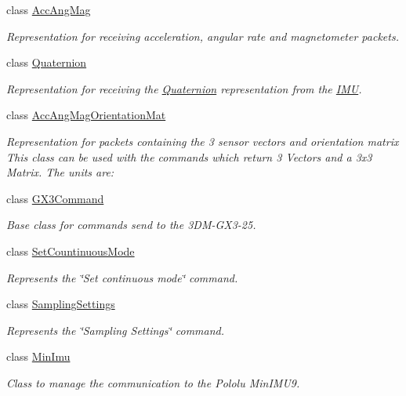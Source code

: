 \begin{DoxyCompactItemize}
class \hyperlink{class_u_s_u_1_1_acc_ang_mag}{\-Acc\-Ang\-Mag}
\begin{DoxyCompactList}\small\item\em \-Representation for receiving acceleration, angular rate and magnetometer packets. \end{DoxyCompactList}\item 
class \hyperlink{class_u_s_u_1_1_quaternion}{\-Quaternion}
\begin{DoxyCompactList}\small\item\em \-Representation for receiving the \hyperlink{class_u_s_u_1_1_quaternion}{\-Quaternion} representation from the \hyperlink{class_i_m_u}{\-I\-M\-U}. \end{DoxyCompactList}\item 
class \hyperlink{class_u_s_u_1_1_acc_ang_mag_orientation_mat}{\-Acc\-Ang\-Mag\-Orientation\-Mat}
\begin{DoxyCompactList}\small\item\em \-Representation for packets containing the 3 sensor vectors and orientation matrix \-This class can be used with the commands which return 3 \-Vectors and a 3x3 \-Matrix. \-The units are\-: \end{DoxyCompactList}\item 
class \hyperlink{class_u_s_u_1_1_g_x3_command}{\-G\-X3\-Command}
\begin{DoxyCompactList}\small\item\em \-Base class for commands send to the 3\-D\-M-\/\-G\-X3-\/25. \end{DoxyCompactList}\item 
class \hyperlink{class_u_s_u_1_1_set_countinuous_mode}{\-Set\-Countinuous\-Mode}
\begin{DoxyCompactList}\small\item\em \-Represents the \char`\"{}\-Set continuous mode\char`\"{} command. \end{DoxyCompactList}\item 
class \hyperlink{class_u_s_u_1_1_sampling_settings}{\-Sampling\-Settings}
\begin{DoxyCompactList}\small\item\em \-Represents the \char`\"{}\-Sampling Settings\char`\"{} command. \end{DoxyCompactList}\item 
class \hyperlink{class_u_s_u_1_1_min_imu}{\-Min\-Imu}
\begin{DoxyCompactList}\small\item\em \-Class to manage the communication to the \-Pololu \-Min\-I\-M\-U9. \end{DoxyCompactList}\item 

\end{DoxyCompactItemize}
